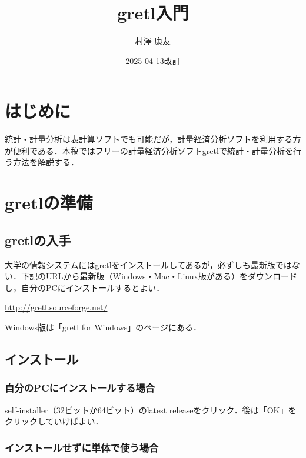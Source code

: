\documentclass[
]{jlreq}
\title{gretl入門}
\author{村澤 康友}
\date{2025-04-13改訂}
\begin{document}
\maketitle

{
\setcounter{tocdepth}{2}
\tableofcontents
}
\section{はじめに}\label{ux306fux3058ux3081ux306b}

統計・計量分析は表計算ソフトでも可能だが，計量経済分析ソフトを利用する方が便利である．本稿ではフリーの計量経済分析ソフトgretlで統計・計量分析を行う方法を解説する．

\section{gretlの準備}\label{gretlux306eux6e96ux5099}

\subsection{gretlの入手}\label{gretlux306eux5165ux624b}

大学の情報システムにはgretlをインストールしてあるが，必ずしも最新版ではない．下記のURLから最新版（Windows・Mac・Linux版がある）をダウンロードし，自分のPCにインストールするとよい．

\url{http://gretl.sourceforge.net/}

Windows版は「gretl for Windows」のページにある．

\subsection{インストール}\label{ux30a4ux30f3ux30b9ux30c8ux30fcux30eb}

\subsubsection{自分のPCにインストールする場合}\label{ux81eaux5206ux306epcux306bux30a4ux30f3ux30b9ux30c8ux30fcux30ebux3059ux308bux5834ux5408}

self-installer（32ビットか64ビット）のlatest releaseをクリック．後は「OK」をクリックしていけばよい．

\subsubsection{インストールせずに単体で使う場合}\label{ux30a4ux30f3ux30b9ux30c8ux30fcux30ebux305bux305aux306bux5358ux4f53ux3067ux4f7fux3046ux5834ux5408}
\end{document}
